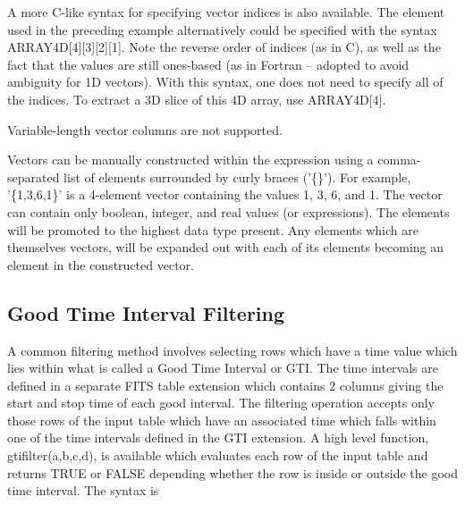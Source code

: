 \documentclass[11pt]{book}
\begin{document}
    A  more  C-like  syntax  for  specifying  vector  indices  is   also
    available.   The element used in the preceding example alternatively
    could be specified with the syntax  ARRAY4D[4][3][2][1].   Note  the
    reverse  order  of  indices  (as in C), as well as the fact that the
    values are still ones-based (as  in  Fortran  --  adopted  to  avoid
    ambiguity  for  1D vectors).  With this syntax, one does not need to
    specify all of the indices.  To  extract  a  3D  slice  of  this  4D
    array, use ARRAY4D[4].

    Variable-length vector columns are not supported.

    Vectors can  be manually constructed  within the expression  using a
    comma-separated list of  elements surrounded by curly braces ('\{\}').
    For example, '\{1,3,6,1\}' is a 4-element vector containing the values
    1, 3, 6, and 1.  The  vector can contain  only boolean, integer, and
    real values (or expressions).  The elements will  be promoted to the
    highest  data type   present.  Any   elements   which  are themselves
    vectors, will be expanded out with  each of its elements becoming an
    element in the constructed vector.


\subsection{Good Time Interval Filtering}

    A common filtering method involves selecting rows which have a time
    value which lies within what is called a Good Time Interval or GTI.
    The time intervals are defined in a separate FITS table extension
    which contains 2 columns giving the start and stop time of each
    good interval.  The filtering operation accepts only those rows of
    the input table which have an associated time which falls within
    one of the time intervals defined in the GTI extension. A high
    level function, gtifilter(a,b,c,d), is available which evaluates
    each row of the input table  and returns TRUE  or FALSE depending
    whether the row is inside or outside the  good time interval.  The
    syntax is
\end{document}
